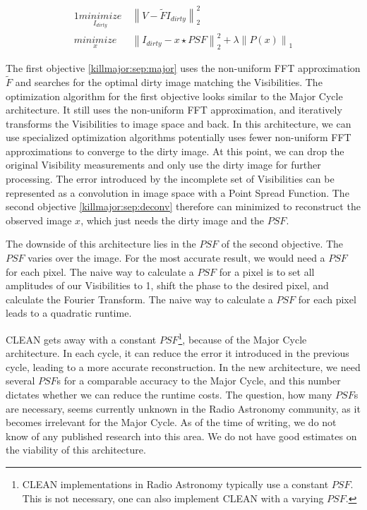 \begin{alignat}{1}
\underset{I_{dirty}}{minimize} \:& \left \|  V - \tilde{F}I_{dirty} \right \|_2^2\label{killmajor:sep:major}\\
\underset{x}{minimize} \:& \left \| I_{dirty} - x \star PSF \right \|_2^2 + \lambda \left \| P(x) \right \|_1 \label{killmajor:sep:deconv}
\end{alignat}

The first objective \eqref{killmajor:sep:major} uses the non-uniform FFT approximation $\tilde{F}$ and searches for the optimal dirty image matching the Visibilities. The optimization algorithm for the first objective looks similar to the Major Cycle architecture. It still uses the non-uniform FFT approximation, and iteratively transforms the Visibilities to image space and back. In this architecture, we can use specialized optimization algorithms potentially uses fewer non-uniform FFT approximations to converge to the dirty image. At this point, we can drop the original Visibility measurements and only use the dirty image for further processing. The error introduced by the incomplete set of Visibilities can be represented as a convolution in image space with a Point Spread Function. The second objective \eqref{killmajor:sep:deconv} therefore can minimized to reconstruct the observed image $x$, which just needs the dirty image and the $PSF$.

The downside of this architecture lies in the $PSF$ of the second objective. The $PSF$ varies over the image. For the most accurate result, we would need a $PSF$ for each pixel. The naive way to calculate a $PSF$ for a pixel is to set all amplitudes of our Visibilities to 1, shift the phase to the desired pixel, and calculate the Fourier Transform. The naive way to calculate a $PSF$ for each pixel leads to a quadratic runtime.

CLEAN gets away with a constant $PSF$\footnote{CLEAN implementations in Radio Astronomy typically use a constant $PSF$. This is not necessary, one can also implement CLEAN with a varying $PSF$.}, because of the Major Cycle architecture. In each cycle, it can reduce the error it introduced in the previous cycle, leading to a more accurate reconstruction. In the new architecture, we need several $PSF$s for a comparable accuracy to the Major Cycle, and this number dictates whether we can reduce the runtime costs. The question, how many $PSF$s are necessary, seems currently unknown in the Radio Astronomy community, as it becomes irrelevant for the Major Cycle. As of the time of writing, we do not know of any published research into this area. We do not have good estimates on the viability of this architecture.


